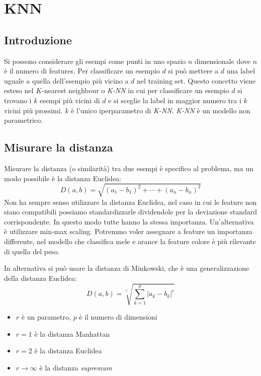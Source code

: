\chapter{KNN}

\section{Introduzione}
Si possono considerare gli esempi come punti in uno spazio $n$ dimensionale dove $n$ \`e il numero di features.
Per classificare un esempio $d$ si pu\`o mettere a $d$ una label uguale a quella dell'esempio pi\`u vicino a $d$ nel training set.
Questo concetto viene esteso nel $K$-nearest neighbour o \emph{K-NN} in cui per classificare un esempio $d$ si trovano i $k$ esempi pi\`u vicini di $d$ e si sceglie la label in maggior numero tra i $k$ vicini pi\`u prossimi. 
$k$ è l'unico iperparametro di \emph{K-NN}.
\emph{K-NN} \`e un modello non parametrico.

\section{Misurare la distanza}
Misurare la distanza (o similarit\`a) tra due esempi \`e specifico al problema, ma un modo possibile \`e la distanza Euclidea:
$$D(a,b)=\sqrt{(a_1-b_1)^2+\cdots+(a_n-b_n)^2}$$
Non ha sempre senso utilizzare la distanza Euclidea, nel caso in cui le feature non siano compatibili possiamo standardizzarle dividendole per la deviazione standard corrispondente. In questo modo tutte hanno la stessa importanza. Un'alternativa \`e utilizzare min-max scaling. 
Potremmo voler assegnare a feature un importanza differente, nel modello che classifica mele e arance la feature colore \`e più rilevante di quella del peso. 

In alternativa si pu\`o usare la distanza di Minkowski, che \`e una generalizzazione della distanza Euclidea:
$$D(a,b) = \sqrt[r]{\sum_{k=1}^{p}{|a_k - b_k|^r}}$$

\begin{multicols}{2}
	\begin{itemize}
		\item $r$ \`e un parametro, $p$ \`e il numero di dimensioni
		\item $r=1$ \`e la distanza Manhattan
		\item $r=2$ \`e la distanza Euclidea
		\item $r\rightarrow\infty$ \`e la distanza \textit{supremum}
	\end{itemize}
\end{multicols}


